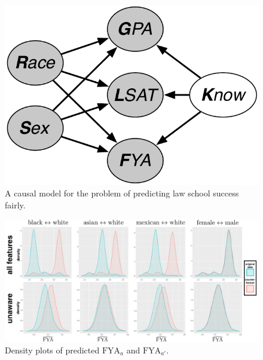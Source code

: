 \begin{figure}[th]
\begin{center}
\vspace{-1ex}
\centerline{\includegraphics[width=0.8\columnwidth]{law_school_model}}
\vspace{-2ex}
\caption{A causal model for the problem of predicting law school success fairly.\label{figure.law_school}\vspace{-2ex}}
\vspace{-2ex}
\end{center}
\end{figure}


\begin{figure}[th]
\begin{center}
 \label{figure.counterfactual}
\vspace{-1ex}
\centerline{\includegraphics[width=\columnwidth]{counterfactual}}
\vspace{-2ex}
\caption{Density plots of predicted $\mbox{FYA}_a$ and $\mbox{FYA}_{a'}$.}
\vspace{-2ex}
\end{center}
\end{figure}


